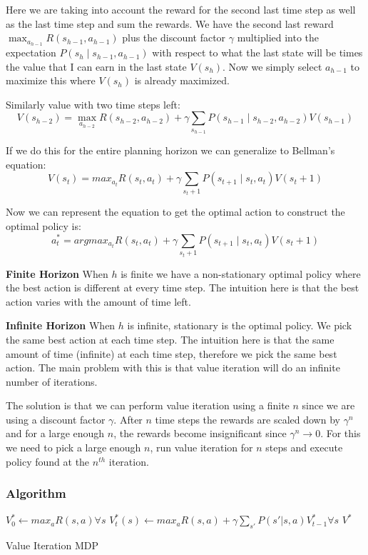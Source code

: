 \documentclass[12pt]{article}
\begin{document}
        Here we are taking into account the reward for the second last time step as well as the last time step and
        sum the rewards. We have the second last reward $\max _{a_{h-1}} R\left(s_{h-1}, a_{h-1}\right)$ plus the
        discount factor $\gamma$ multiplied into the expectation $P(s_{h} \mid s_{h-1}, a_{h-1})$ with respect to
        what the last state will be times the value that I can earn in the last state $V(s_h)$. Now we simply select
        $a_{h-1}$ to maximize this where $V(s_h)$ is already maximized.

        Similarly value with two time steps left:
        $$ V\left(s_{h-2}\right)=\max _{a_{h-2}} R\left(s_{h-2}, a_{h-2}\right)+\gamma \sum_{s_{h-1}} P(s_{h-1} \mid
        s_{h-2}, a_{h-2}) V\left(s_{h-1}\right) $$

        If we do this for the entire planning horizon we can generalize to Bellman's equation:
        $$ V(s_t) = max_{a_t} R(s_t, a_t) + \gamma \sum_{s_t + 1} P(s_{t+1} \mid s_t, a_t) V(s_t + 1) $$

        Now we can represent the equation to get the optimal action to construct the optimal policy is:
        $$ a_t^* = argmax_{a_t} R(s_t, a_t) + \gamma \sum_{s_t + 1} P(s_{t+1} \mid s_t, a_t) V(s_t + 1) $$

        \textbf{Finite Horizon}
            When $h$ is finite we have a non-stationary optimal policy where the best action is different at every
            time step. The intuition here is that the best action varies with the amount of time left.

        \textbf{Infinite Horizon}
            When $h$ is infinite, stationary is the optimal policy. We pick the same best action at each time step.
            The intuition here is that the same amount of time (infinite) at each time step, therefore we pick the
            same best action. The main problem with this is that value iteration will do an infinite number of
            iterations. 

            The solution is that we can perform value iteration using a finite $n$ since we are using a discount
            factor $\gamma$. After $n$ time steps the rewards are scaled down by $\gamma^n$ and for a large enough
            $n$, the rewards become insignificant since $\gamma^n \rightarrow 0$. For this we need to pick a large
            enough $n$, run value iteration for $n$ steps and execute policy found at the $n^{th}$ iteration.

        \subsubsection{Algorithm}
            \begin{algorithm}[H]
                \SetAlgoLined
                $V_0^* \gets max_a R(s,a) \forall s$\;
                 {
                    $V_t^*(s) \gets max_a R(s,a) + \gamma \sum_{s'}P(s' | s,a)V_{t-1}^* \forall s$
                }
                \Return $V^*$
                \caption{Value Iteration MDP}
            \end{algorithm}
\end{document}
